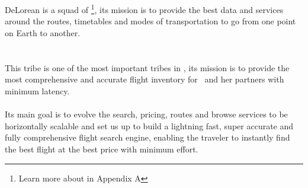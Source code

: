 
\section{\squad}

DeLorean\cite{delorean_squad_home} is a squad of \tribe\footnote{Learn more about \textit{} in Appendix A}, its mission is to provide the best data and services around the routes, timetables and modes of transportation to go from one point on Earth to another.


\section{\tribe}

This tribe\cite{marketplace_engine_home} is one of the most important tribes in \company, its mission is to provide the most comprehensive and accurate flight inventory for \company\ and her partners with minimum latency.
\\\\
Its main goal is to evolve the search, pricing, routes and browse services to be horizontally scalable and set us up to build a lightning fast, super accurate and fully comprehensive flight search engine, enabling the traveler to instantly find the best flight at the best price with minimum effort.

